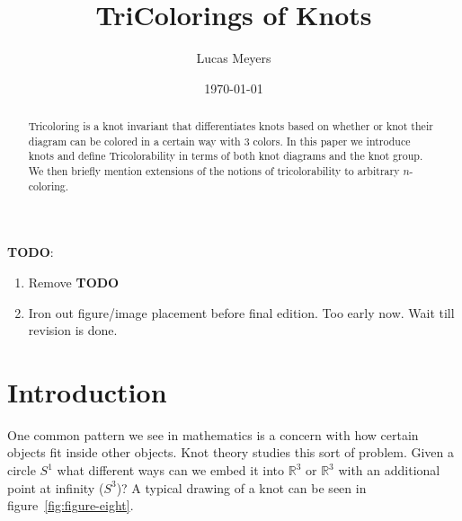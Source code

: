 \documentclass[12pt]{amsart}
\theoremstyle{definition}
\theoremstyle{remark}
\numberwithin{equation}{section}
\newcommand{\bb}[1]{\mathbb{#1}}
\begin{document}
\title{TriColorings of Knots}


\author{Lucas Meyers}
\address{Mathematics Department\\
Louisiana State University\\
Baton Rouge, Louisiana}

\date{\today}

\begin{abstract}
  Tricoloring is a knot invariant that differentiates knots
  based on whether or knot their diagram can be colored in a
  certain way with 3 colors. In this paper we introduce knots
  and define Tricolorability in terms of both knot diagrams
  and the knot group. We then briefly mention extensions
  of the notions of tricolorability to arbitrary $n$-coloring.
\end{abstract}

\maketitle
\textbf{TODO}:
\begin{enumerate}
\item Remove \textbf{TODO}
\item Iron out figure/image placement before final edition. Too early
  now. Wait till revision is done.
\end{enumerate}

\section{Introduction}
\label{introduction}

One common pattern we see in mathematics is a concern with how
certain objects fit inside other objects. Knot theory studies this
sort of problem. Given a circle $S^1$ what different ways can we embed
it into $\bb{R}^3$ or $\bb{R}^3$  with an additional point at infinity ($S^3$)?
A typical drawing of a knot can be seen in figure~\ref{fig:figure-eight}.
\end{document}
